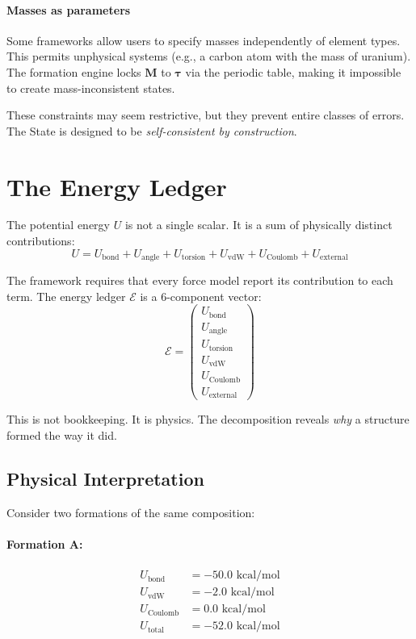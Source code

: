 \documentclass[11pt]{article}
\begin{document}
\paragraph{Masses as parameters} Some frameworks allow users to specify masses independently of element types. This permits unphysical systems (e.g., a carbon atom with the mass of uranium). The formation engine locks $\mathbf{M}$ to $\boldsymbol{\tau}$ via the periodic table, making it impossible to create mass-inconsistent states.

These constraints may seem restrictive, but they prevent entire classes of errors. The State is designed to be \textit{self-consistent by construction}.

\section{The Energy Ledger}

The potential energy $U$ is not a single scalar. It is a sum of physically distinct contributions:
\begin{equation}
U = U_{\text{bond}} + U_{\text{angle}} + U_{\text{torsion}} + U_{\text{vdW}} + U_{\text{Coulomb}} + U_{\text{external}}
\end{equation}

The framework requires that every force model report its contribution to each term. The energy ledger $\mathcal{E}$ is a 6-component vector:
\begin{equation}
\mathcal{E} = \begin{pmatrix}
U_{\text{bond}} \\
U_{\text{angle}} \\
U_{\text{torsion}} \\
U_{\text{vdW}} \\
U_{\text{Coulomb}} \\
U_{\text{external}}
\end{pmatrix}
\end{equation}

This is not bookkeeping. It is physics. The decomposition reveals \textit{why} a structure formed the way it did.

\subsection{Physical Interpretation}

Consider two formations of the same composition:

\paragraph{Formation A:}
\begin{align*}
U_{\text{bond}} &= -50.0 \text{ kcal/mol} \\
U_{\text{vdW}} &= -2.0 \text{ kcal/mol} \\
U_{\text{Coulomb}} &= 0.0 \text{ kcal/mol} \\
U_{\text{total}} &= -52.0 \text{ kcal/mol}
\end{align*}
\end{document}
